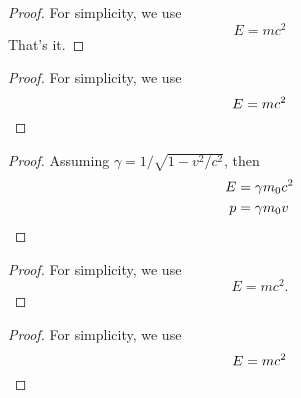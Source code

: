 \documentclass{article}
\theoremstyle{definition} \newtheorem{law}{Law}
\theoremstyle{plain} \newtheorem{jury}[law]{Jury}
\theoremstyle{remark} \newtheorem*{mar}{Margaret}
\begin{document}
\begin{proof}
For simplicity, we use
\[
E=mc^2
\]
That's it.
\end{proof}

\begin{proof}
For simplicity, we use
\[
E=mc^2 \qedhere
\]
\end{proof}

\begin{proof}
Assuming $\gamma
= 1/\sqrt{1-v^2/c^2}$, then
\begin{align*}
E &= \gamma m_0 c^2 \\
p &= \gamma m_0v \qedhere
\end{align*}
\end{proof}

\begin{proof}
For simplicity, we use
\begin{equation}
E=mc^2.
\end{equation}
\end{proof}

\renewcommand{\qedsymbol}%
{\rule{1ex}{1.5ex}}
\begin{proof}
For simplicity, we use
\[
E=mc^2 \qedhere
\]
\end{proof}
\end{document}
